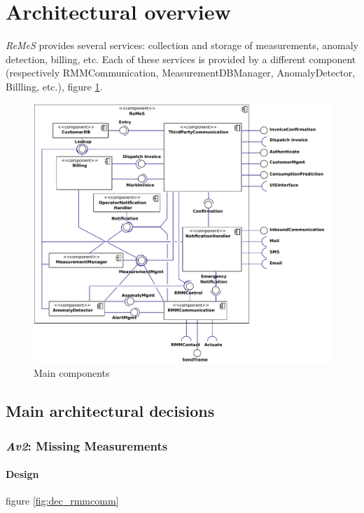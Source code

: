 \documentclass[a4paper,10pt]{article}
\newcommand{\rem}{\emph{ReMeS}\xspace}
\begin{document}
\section{Architectural overview}\label{sec:main-decomposition}
\rem provides several services: collection and storage of measurements, anomaly detection, billing, etc.
Each of these services is provided by a different component (respectively RMMCommunication, MeasurementDBManager, AnomalyDetector, Billling, etc.), figure \ref{fig:cc-primary}.

\begin{figure}[!htp]
    \centering
    \includegraphics[width=\textwidth]{Main Component Diagram}
    \caption{Main components}\label{fig:cc-primary}
\end{figure}

\subsection{Main architectural decisions}

\subsubsection{\emph{Av2}: Missing Measurements}

\paragraph{Design} figure \ref{fig:dec_rmmcomm}
\end{document}
